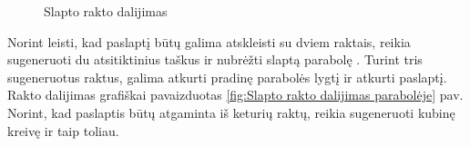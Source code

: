 \documentclass{VUMIFInfBakalaurinis}
\begin{document}
\begin{figure}[ht]%
 \centering
 \caption{Slapto rakto dalijimas}%
 \label{fig:Slapto rakto dalijimas}%
\end{figure}

\par Norint leisti, kad paslaptį būtų galima atskleisti su dviem raktais, reikia sugeneruoti du atsitiktinius taškus ir nubrėžti slaptą parabolę \cite{23}. Turint tris sugeneruotus raktus, galima atkurti pradinę parabolės lygtį ir atkurti paslaptį. Rakto dalijimas grafiškai pavaizduotas \ref{fig:Slapto rakto dalijimas parabolėje} pav. Norint, kad paslaptis būtų atgaminta iš keturių raktų, reikia sugeneruoti kubinę kreivę ir taip toliau. %
\end{document}
